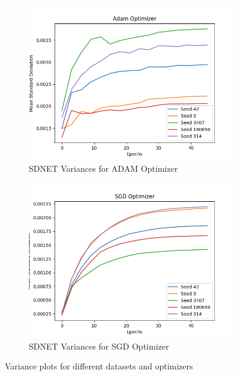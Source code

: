 \begin{figure}[h!]
      \begin{subfigure}[b]{0.45\textwidth}
        \includegraphics[width=\textwidth]{figures/crack_adam_curves_std.png}
        \caption{SDNET Variances for ADAM Optimizer}
        \label{fig:sdnet_adam}
      \end{subfigure}
      \hfill
      \begin{subfigure}[b]{0.45\textwidth}
        \includegraphics[width=\textwidth]{figures/crack_sgd_curves.png}
        \caption{SDNET Variances for SGD Optimizer}
        \label{fig:sdnet_sgd}
      \end{subfigure}
      
      \caption{Variance plots for different datasets and optimizers}
      \label{fig:variance_plots}
    \end{figure}

